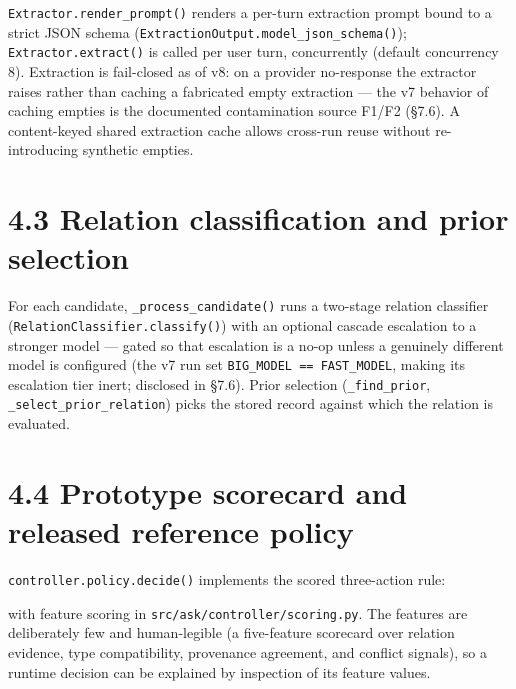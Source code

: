 \texttt{Extractor.render\_prompt()} renders a per-turn extraction prompt
bound to a strict JSON schema
(\texttt{ExtractionOutput.model\_json\_schema()});
\texttt{Extractor.extract()} is called per user turn, concurrently
(default concurrency 8). Extraction is fail-closed as of v8: on a
provider no-response the extractor raises rather than caching a
fabricated empty extraction --- the v7 behavior of caching empties is
the documented contamination source F1/F2 (§7.6). A content-keyed shared
extraction cache allows cross-run reuse without re-introducing synthetic
empties.

\section{4.3 Relation classification and prior
selection}\label{relation-classification-and-prior-selection}

For each candidate, \texttt{\_process\_candidate()} runs a two-stage
relation classifier (\texttt{RelationClassifier.classify()}) with an
optional cascade escalation to a stronger model --- gated so that
escalation is a no-op unless a genuinely different model is configured
(the v7 run set \texttt{BIG\_MODEL\ ==\ FAST\_MODEL}, making its
escalation tier inert; disclosed in §7.6). Prior selection
(\texttt{\_find\_prior}, \texttt{\_select\_prior\_relation}) picks the
stored record against which the relation is evaluated.

\section{4.4 Prototype scorecard and released reference
policy}\label{prototype-scorecard-and-released-reference-policy}

\texttt{controller.policy.decide()} implements the scored three-action
rule:

\begin{Shaded}
\begin{Highlighting}[]
\end{Highlighting}
\end{Shaded}

with feature scoring in \texttt{src/ask/controller/scoring.py}. The
features are deliberately few and human-legible (a five-feature
scorecard over relation evidence, type compatibility, provenance
agreement, and conflict signals), so a runtime decision can be explained
by inspection of its feature values.

